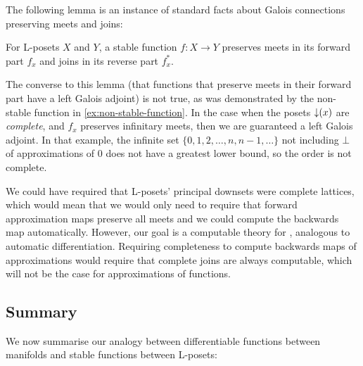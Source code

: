 The following lemma is an instance of standard facts about Galois connections preserving meets and joins:

\begin{lemma}
  For L-posets $X$ and $Y$, a stable function $f : X \to Y$ preserves
  meets in its forward part $f_x$ and joins in its reverse part
  $f^*_x$.
\end{lemma}

The converse to this lemma (that functions that preserve meets in their forward part have a left Galois adjoint) is not true, as was demonstrated by the non-stable function in \autoref{ex:non-stable-function}. In the case when the posets $\mathop{\downarrow}(x)$ are \emph{complete}, and $f_x$ preserves infinitary meets, then we are guaranteed a left Galois adjoint. In that example, the infinite set $\{0, 1, 2, \dots, n, n-1, \dots\}$ not including $\bot$ of approximations of $0$ does not have a greatest lower bound, so the order is not complete.

We could have required that L-posets' principal downsets were complete lattices, which would mean that we would only need to require that forward approximation maps preserve all meets and we could compute the backwards map automatically. However, our goal is a computable theory for \GPS, analogous to automatic differentiation. Requiring completeness to compute backwards maps of approximations would require that complete joins are always computable, which will not be the case for approximations of functions.

\subsection{Summary}
\label{sec:diff-stab-summary}

We now summarise our analogy between differentiable functions between manifolds and stable functions between L-posets:

